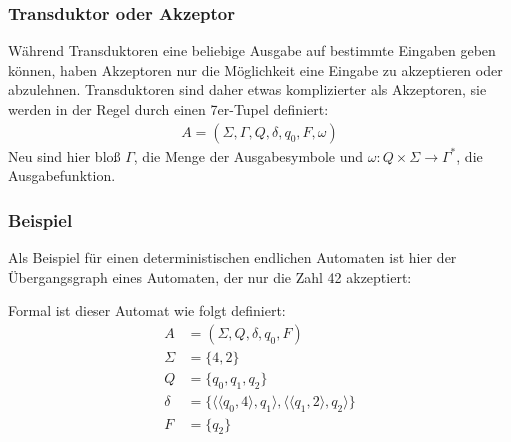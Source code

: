 \subsubsection{Transduktor oder Akzeptor}
\begin{flushleft}
    Während Transduktoren eine beliebige Ausgabe auf bestimmte Eingaben geben können, haben 
    Akzeptoren nur die Möglichkeit eine Eingabe zu akzeptieren oder abzulehnen.
    Transduktoren sind daher etwas komplizierter als Akzeptoren, sie werden in der Regel durch einen 7er-Tupel definiert:
    \begin{align}
        A=(\Sigma,\Gamma,Q,\delta,q_0,F,\omega)
    \end{align}
    Neu sind hier bloß $\Gamma$, die Menge der Ausgabesymbole und $\omega: Q \times \Sigma \rightarrow \Gamma^*$, die Ausgabefunktion.
\end{flushleft}

\subsubsection{Beispiel}
\begin{flushleft}
    Als Beispiel für einen deterministischen endlichen Automaten ist hier der Übergangsgraph eines
    Automaten, der nur die Zahl 42 akzeptiert:
    \begin{center}
    \end{center}
    Formal ist dieser Automat wie folgt definiert:
    \begin{align}
        A &= (\Sigma,Q,\delta,q_0,F) \\
        \Sigma &= \{4,2\} \\
        Q &= \{q_0,q_1,q_2\} \\
        \delta &= \{\langle \langle q_0, 4 \rangle, q_1 \rangle, \langle \langle q_1, 2 \rangle, q_2 \rangle \} \\
        F &= \{q_2\}
    \end{align}
\end{flushleft}
